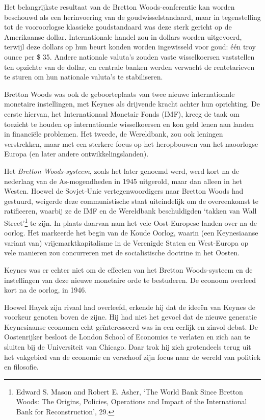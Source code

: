 \documentclass[smalldemyvopaper,11pt,twoside,onecolumn,openright,extrafontsizes,hidelinks]{memoir}
\begin{document}
Het belangrijkste resultaat van de Bretton Woods-conferentie kan worden
beschouwd als een herinvoering van de goudwisselstandaard, maar in
tegenstelling tot de vooroorlogse klassieke goudstandaard was deze sterk
gericht op de Amerikaanse dollar. Internationale handel zou in dollars
worden uitgevoerd, terwijl deze dollars op hun beurt konden worden
ingewisseld voor goud: één troy ounce per \$ 35. Andere nationale
valuta's zouden vaste wisselkoersen vaststellen ten opzichte van de
dollar, en centrale banken werden verwacht de rentetarieven te sturen om
hun nationale valuta's te stabiliseren.

Bretton Woods was ook de geboorteplaats van twee nieuwe internationale
monetaire instellingen, met Keynes als drijvende kracht achter hun
oprichting. De eerste hiervan, het Internationaal Monetair Fonds (IMF),
kreeg de taak om toezicht te houden op internationale wisselkoersen en
kon geld lenen aan landen in financiële problemen. Het tweede, de
Wereldbank, zou ook leningen verstrekken, maar met een sterkere focus op
het heropbouwen van het naoorlogse Europa (en later andere
ontwikkelingslanden).

Het \emph{Bretton Woods-systeem}, zoals het later genoemd werd, werd
kort na de nederlaag van de As-mogendheden in 1945 uitgerold, maar dan
alleen in het Westen. Hoewel de Sovjet-Unie vertegenwoordigers naar
Bretton Woods had gestuurd, weigerde deze communistische staat
uiteindelijk om de overeenkomst te ratificeren, waarbij ze de IMF en de
Wereldbank beschuldigden `takken van Wall Street'\footnote{\hspace{0pt}Edward
  S. Mason and Robert E. Asher, `The World Bank Since Bretton Woods: The
  Origins, Policies, Operations and Impact of the International Bank for
  Reconstruction', 29.} te zijn. In plaats daarvan nam het vele
Oost-Europese landen over na de oorlog. Het markeerde het begin van de
Koude Oorlog, waarin (een Keynesiaanse variant van)
vrijemarktkapitalisme in de Verenigde Staten en West-Europa op vele
manieren zou concurreren met de socialistische doctrine in het Oosten.

Keynes was er echter niet om de effecten van het Bretton Woods-systeem
en de instellingen van deze nieuwe monetaire orde te bestuderen. De
econoom overleed kort na de oorlog, in 1946.

Hoewel Hayek zijn rivaal had overleefd, erkende hij dat de ideeën van
Keynes de voorkeur genoten boven de zijne. Hij had niet het gevoel dat
de nieuwe generatie Keynesiaanse economen echt geïnteresseerd was in een
eerlijk en zinvol debat. De Oostenrijker besloot de London School of
Economics te verlaten en zich aan te sluiten bij de Universiteit van
Chicago. Daar trok hij zich grotendeels terug uit het vakgebied van de
economie en verschoof zijn focus naar de wereld van politiek en
filosofie.
\end{document}
